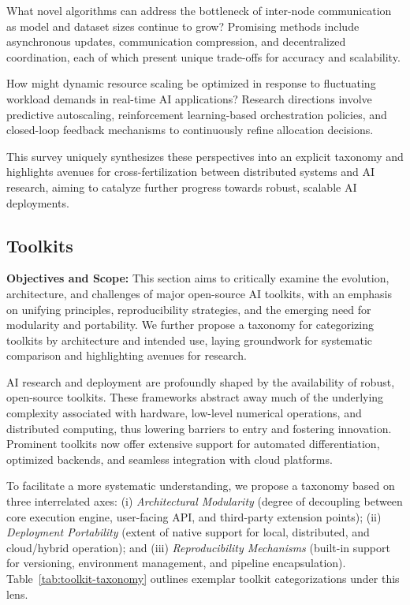 \documentclass[sigconf]{acmart}
\begin{document}
What novel algorithms can address the bottleneck of inter-node communication as model and dataset sizes continue to grow? Promising methods include asynchronous updates, communication compression, and decentralized coordination, each of which present unique trade-offs for accuracy and scalability.

How might dynamic resource scaling be optimized in response to fluctuating workload demands in real-time AI applications? Research directions involve predictive autoscaling, reinforcement learning-based orchestration policies, and closed-loop feedback mechanisms to continuously refine allocation decisions.

This survey uniquely synthesizes these perspectives into an explicit taxonomy and highlights avenues for cross-fertilization between distributed systems and AI research, aiming to catalyze further progress towards robust, scalable AI deployments.

\subsection{Toolkits}
\textbf{Objectives and Scope:} This section aims to critically examine the evolution, architecture, and challenges of major open-source AI toolkits, with an emphasis on unifying principles, reproducibility strategies, and the emerging need for modularity and portability. We further propose a taxonomy for categorizing toolkits by architecture and intended use, laying groundwork for systematic comparison and highlighting avenues for research.

AI research and deployment are profoundly shaped by the availability of robust, open-source toolkits. These frameworks abstract away much of the underlying complexity associated with hardware, low-level numerical operations, and distributed computing, thus lowering barriers to entry and fostering innovation. Prominent toolkits now offer extensive support for automated differentiation, optimized backends, and seamless integration with cloud platforms.

To facilitate a more systematic understanding, we propose a taxonomy based on three interrelated axes: (i) \emph{Architectural Modularity} (degree of decoupling between core execution engine, user-facing API, and third-party extension points); (ii) \emph{Deployment Portability} (extent of native support for local, distributed, and cloud/hybrid operation); and (iii) \emph{Reproducibility Mechanisms} (built-in support for versioning, environment management, and pipeline encapsulation). Table~\ref{tab:toolkit-taxonomy} outlines exemplar toolkit categorizations under this lens.
\end{document}
